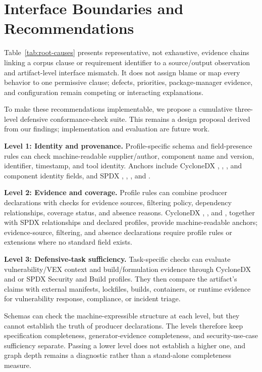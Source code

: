 \section{Interface Boundaries and Recommendations}
\label{sec:root-causes}

Table~\ref{tab:root-causes} presents representative, not exhaustive, evidence chains linking a corpus clause or requirement identifier to a source/output observation and artifact-level interface mismatch. It does not assign blame or map every behavior to one permissive clause; defects, priorities, package-manager evidence, and configuration remain competing or interacting explanations.

To make these recommendations implementable, we propose a cumulative three-level defensive conformance-check suite. This remains a design proposal derived from our findings; implementation and evaluation are future work.

\noindent\textbf{Level 1: Identity and provenance.} Profile-specific schema and field-presence rules can check machine-readable supplier/author, component name and version, identifier, timestamp, and tool identity. Anchors include CycloneDX , , , and component identity fields, and SPDX , , , and .

\noindent\textbf{Level 2: Evidence and coverage.} Profile rules can combine producer declarations with checks for evidence sources, filtering policy, dependency relationships, coverage status, and absence reasons. CycloneDX , , and , together with SPDX relationships and declared profiles, provide machine-readable anchors; evidence-source, filtering, and absence declarations require profile rules or extensions where no standard field exists.

\noindent\textbf{Level 3: Defensive-task sufficiency.} Task-specific checks can evaluate vulnerability/VEX context and build/formulation evidence through CycloneDX  and  or SPDX Security and Build profiles. They then compare the artifact's claims with external manifests, lockfiles, builds, containers, or runtime evidence for vulnerability response, compliance, or incident triage.

Schemas can check the machine-expressible structure at each level, but they cannot establish the truth of producer declarations. The levels therefore keep specification completeness, generator-evidence completeness, and security-use-case sufficiency separate. Passing a lower level does not establish a higher one, and graph depth remains a diagnostic rather than a stand-alone completeness measure.
